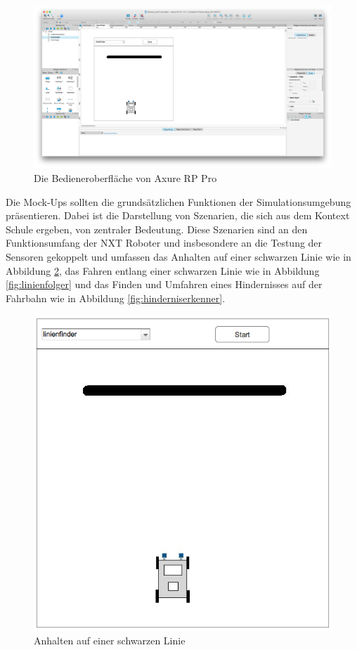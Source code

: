 \documentclass[paper=a4, DIV=calc, BCOR=12mm, twoside=on, onecolumn=on, open = right, titlepage =on, parskip =half-, headsepline = on, footsepline = off, chapterprefix = off, appendixprefix = on, fontsize = 12pt, numbers = noenddot, abstract = on]{scrbook}
\begin{document}
\begin{figure}[htb]
\centering
\includegraphics[width=\textwidth]{images/axure_mockup.png} 
\caption{Die Bedieneroberfläche von Axure RP Pro}
\label{fig:axure}
\end{figure}

Die Mock-Ups sollten die grundsätzlichen Funktionen der Simulationsumgebung präsentieren. Dabei ist die Darstellung von Szenarien, die sich aus dem Kontext Schule ergeben, von zentraler Bedeutung. Diese Szenarien sind an den Funktionsumfang der NXT Roboter und insbesondere an die Testung der Sensoren gekoppelt und umfassen das Anhalten auf einer schwarzen Linie wie in Abbildung \ref{fig:linienfinder}, das Fahren entlang einer schwarzen Linie wie in Abbildung \ref{fig:linienfolger} und das Finden und Umfahren eines Hindernisses auf der Fahrbahn wie in Abbildung \ref{fig:hinderniserkenner}.


\begin{figure}[htb]
\centering
\includegraphics[scale=0.5]{images/mockup_linienfinder.png}
\caption{Anhalten auf einer schwarzen Linie}
\label{fig:linienfinder}
\end{figure}
\end{document}
